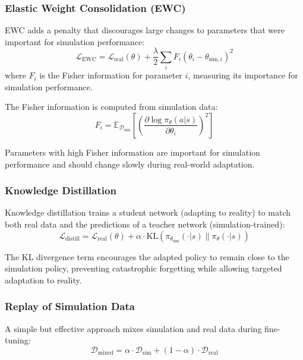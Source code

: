 \subsubsection{Elastic Weight Consolidation (EWC)}

EWC adds a penalty that discourages large changes to parameters that were important for simulation performance:
\begin{equation}
\mathcal{L}_{\text{EWC}} = \mathcal{L}_{\text{real}}(\theta) + \frac{\lambda}{2} \sum_i F_i (\theta_i - \theta_{\text{sim},i})^2
\label{eq:ewc_loss}
\end{equation}
where $F_i$ is the Fisher information for parameter $i$, measuring its importance for simulation performance.

The Fisher information is computed from simulation data:
\begin{equation}
F_i = \mathbb{E}_{\mathcal{D}_{\text{sim}}} \left[ \left( \frac{\partial \log \pi_\theta(a|s)}{\partial \theta_i} \right)^2 \right]
\end{equation}

Parameters with high Fisher information are important for simulation performance and should change slowly during real-world adaptation.

\subsubsection{Knowledge Distillation}

Knowledge distillation trains a student network (adapting to reality) to match both real data and the predictions of a teacher network (simulation-trained):
\begin{equation}
\mathcal{L}_{\text{distill}} = \mathcal{L}_{\text{real}}(\theta) + \alpha \cdot \text{KL}(\pi_{\theta_{\text{sim}}}(\cdot|s) \| \pi_\theta(\cdot|s))
\end{equation}

The KL divergence term encourages the adapted policy to remain close to the simulation policy, preventing catastrophic forgetting while allowing targeted adaptation to reality.

\subsubsection{Replay of Simulation Data}

A simple but effective approach mixes simulation and real data during fine-tuning:
\begin{equation}
\mathcal{D}_{\text{mixed}} = \alpha \cdot \mathcal{D}_{\text{sim}} + (1-\alpha) \cdot \mathcal{D}_{\text{real}}
\end{equation}

